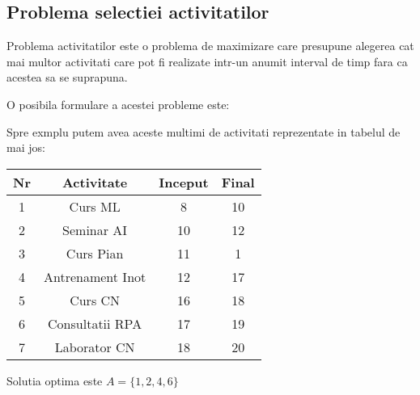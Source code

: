 	\subsection{Problema selectiei activitatilor}	
	Problema activitatilor este o problema de maximizare care presupune alegerea cat mai multor activitati care pot fi realizate intr-un anumit interval de timp fara ca acestea sa se suprapuna.
\vspace{0.5cm}
\par	 
O posibila formulare a acestei probleme este: \par
{}

\par
\vspace{1cm}
Spre exmplu putem avea aceste multimi de activitati reprezentate in tabelul de mai jos:
\begin{table}[h!]
	\centering
	\begin{tabular}{||c c c c||} 
		\hline
		Nr & Activitate & Inceput & Final \\ [1ex] 
		\hline\hline
		1 & Curs ML & 8 & 10\\ \hline
		2 & Seminar AI & 10 & 12 \\\hline
		3 & Curs Pian & 11 & 1 \\\hline
		4 & Antrenament Inot & 12 & 17 \\ \hline
		5 & Curs CN & 16 & 18 \\\hline
		6 & Consultatii RPA & 17 & 19 \\ \hline
		7 & Laborator CN & 18 & 20 \\ [1ex] 
		\hline
	\end{tabular}
\end{table}
\par
Solutia optima este $A = \{1, 2, 4, 6  \} $


